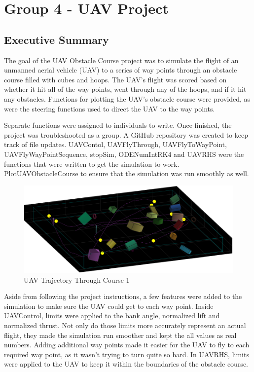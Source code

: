 \documentclass[12pt]{article}
\begin{document}
\section*{\centering Group 4 - UAV Project}
\subsection*{\centering Executive Summary} 

The goal of the UAV Obstacle Course project was to simulate the flight of an unmanned aerial vehicle (UAV) to a series of way points through an obstacle course filled with cubes and hoops. The UAV’s flight was scored based on whether it hit all of the way points, went through any of the hoops, and if it hit any obstacles. Functions for plotting the UAV’s obstacle course were provided, as were the steering functions used to direct the UAV to the way points.

Separate functions were assigned to individuals to write. Once finished, the project was troubleshooted as a group. A GitHub repository was created to keep track of file updates. UAVContol, UAVFlyThrough, UAVFlyToWayPoint, UAVFlyWayPointSequence, stopSim, ODENumIntRK4 and UAVRHS were the functions that were written to get the simulation to work. PlotUAVObstacleCourse to ensure that the simulation was run smoothly as well. \\


\begin{figure}
	\begin{center}
		\includegraphics[scale=0.5]{Course1Traj}
		\caption{UAV Trajectory Through Course 1}
	\end{center}
\end{figure} 

Aside from following the project instructions, a few features were added to the simulation to make sure the UAV could get to each way point. Inside UAVControl, limits were applied to the bank angle, normalized lift and normalized thrust. Not only do those limits more accurately represent an actual flight, they made the simulation run smoother and kept the all values as real numbers. Adding additional way points made it easier for the UAV to fly to each required way point, as it wasn’t trying to turn quite so hard. In UAVRHS, limits were applied to the UAV to keep it within the boundaries of the obstacle course. 
\end{document}
